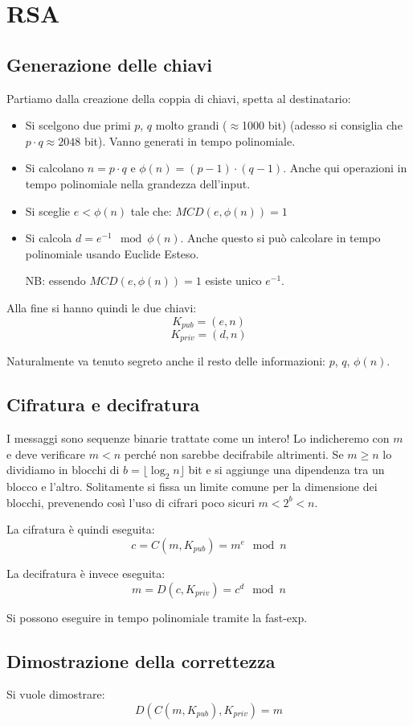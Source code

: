 \section{RSA}
\subsection{Generazione delle chiavi}
Partiamo dalla creazione della coppia di chiavi, spetta al destinatario:
\begin{itemize}
    \item Si scelgono due primi $p$, $q$ molto grandi ($\approx$1000 bit) (adesso si consiglia che $p \cdot q \approx 2048$ bit). Vanno generati in tempo polinomiale.
    \item Si calcolano $n = p \cdot q$ e $\phi(n) = (p-1) \cdot (q-1)$. Anche qui operazioni in tempo polinomiale nella grandezza dell'input.
    \item Si sceglie $e < \phi(n)$ tale che: $MCD(e, \phi(n))=1$
    \item Si calcola $d = e^{-1} \mod \phi(n)$. Anche questo si può calcolare in tempo polinomiale usando Euclide Esteso.
    
    NB: essendo $MCD(e, \phi(n))=1$ esiste unico $e^{-1}$.
\end{itemize}

Alla fine si hanno quindi le due chiavi:
$$ K_{pub} = (e,n) $$
$$ K_{priv} = (d,n) $$

Naturalmente va tenuto segreto anche il resto delle informazioni: $p$, $q$, $\phi(n)$.

\subsection{Cifratura e decifratura}
I messaggi sono sequenze binarie trattate come un intero! Lo indicheremo con $m$ e deve verificare $m < n$ perché non sarebbe decifrabile altrimenti.
Se $m \geq n$ lo dividiamo in blocchi di $b = \lfloor \log_2n \rfloor$ bit e si aggiunge una dipendenza tra un blocco e l'altro.
Solitamente si fissa un limite comune per la dimensione dei blocchi, prevenendo così l'uso di cifrari poco sicuri $m < 2^b < n$.

La cifratura è quindi eseguita:
$$ c = C(m, K_{pub}) = m^{e} \mod n$$

La decifratura è invece eseguita:
$$ m = D(c, K_{priv}) = c^{d} \mod n$$

Si possono eseguire in tempo polinomiale tramite la fast-exp.

\subsection{Dimostrazione della correttezza}
Si vuole dimostrare:
$$ D(C(m, K_{pub}), K_{priv}) = m $$

